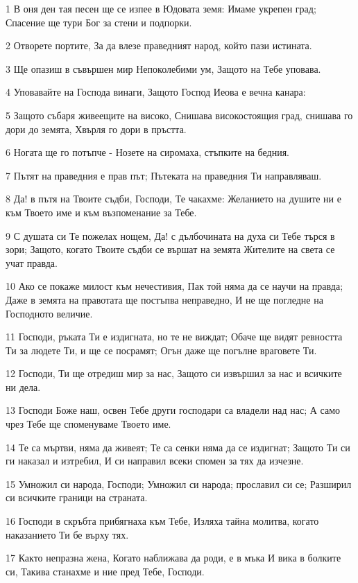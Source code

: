 \par 1 В оня ден тая песен ще се изпее в Юдовата земя: Имаме укрепен град; Спасение ще тури Бог за стени и подпорки.
\par 2 Отворете портите, За да влезе праведният народ, който пази истината.
\par 3 Ще опазиш в съвършен мир Непоколебими ум, Защото на Тебе уповава.
\par 4 Уповавайте на Господа винаги, Защото Господ Иеова е вечна канара:
\par 5 Защото събаря живеещите на високо, Снишава високостоящия град, снишава го дори до земята, Хвърля го дори в пръстта.
\par 6 Ногата ще го потъпче - Нозете на сиромаха, стъпките на бедния.
\par 7 Пътят на праведния е прав път; Пътеката на праведния Ти направляваш.
\par 8 Да! в пътя на Твоите съдби, Господи, Те чакахме: Желанието на душите ни е към Твоето име и към възпоменание за Тебе.
\par 9 С душата си Те пожелах нощем, Да! с дълбочината на духа си Тебе търся в зори; Защото, когато Твоите съдби се вършат на земята Жителите на света се учат правда.
\par 10 Ако се покаже милост към нечестивия, Пак той няма да се научи на правда; Даже в земята на правотата ще постъпва неправедно, И не ще погледне на Господното величие.
\par 11 Господи, ръката Ти е издигната, но те не виждат; Обаче ще видят ревността Ти за людете Ти, и ще се посрамят; Огън даже ще погълне враговете Ти.
\par 12 Господи, Ти ще отредиш мир за нас, Защото си извършил за нас и всичките ни дела.
\par 13 Господи Боже наш, освен Тебе други господари са владели над нас; А само чрез Тебе ще споменуваме Твоето име.
\par 14 Те са мъртви, няма да живеят; Те са сенки няма да се издигнат; Защото Ти си ги наказал и изтребил, И си направил всеки спомен за тях да изчезне.
\par 15 Умножил си народа, Господи; Умножил си народа; прославил си се; Разширил си всичките граници на страната.
\par 16 Господи в скръбта прибягнаха към Тебе, Изляха тайна молитва, когато наказанието Ти бе върху тях.
\par 17 Както непразна жена, Когато наближава да роди, е в мъка И вика в болките си, Такива станахме и ние пред Тебе, Господи.
